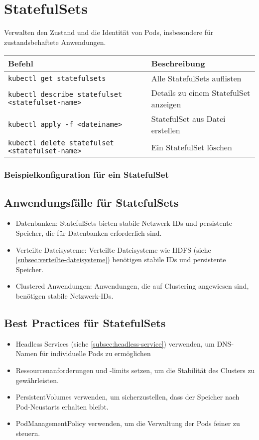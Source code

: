 \newpage
\section{StatefulSets}
\label{sec:statefulsets}

Verwalten den Zustand und die Identität von Pods, insbesondere für zustandsbehaftete Anwendungen. \\

\noindent
\begin{tabular}{
|l|l|}
\hline
\textbf{Befehl} & \textbf{Beschreibung} \\
\hline
\texttt{kubectl get statefulsets} & Alle StatefulSets auflisten \\
\texttt{kubectl describe statefulset <statefulset-name>} & Details zu einem StatefulSet anzeigen \\
\texttt{kubectl apply -f <dateiname>} & StatefulSet aus Datei erstellen\\
\texttt{kubectl delete statefulset <statefulset-name>} & Ein StatefulSet löschen \\
\hline
\end{tabular}

\subsubsection{Beispielkonfiguration für ein StatefulSet}


\newpage
\subsection{Anwendungsfälle für StatefulSets}
\begin{itemize}
    \item Datenbanken: StatefulSets bieten stabile Netzwerk-IDs und persistente Speicher, die für Datenbanken erforderlich sind.
    \item Verteilte Dateisysteme: Verteilte Dateisysteme wie HDFS (siehe \ref{subsec:verteilte-dateisysteme}) benötigen stabile IDs und persistente Speicher.
    \item Clustered Anwendungen: Anwendungen, die auf Clustering angewiesen sind, benötigen stabile Netzwerk-IDs.
\end{itemize}
\subsection{Best Practices für StatefulSets}
\begin{itemize}
    \item Headless Services (siehe \ref{subsec:headless-service}) verwenden, um DNS-Namen für individuelle Pods zu ermöglichen
    \item Ressourcenanforderungen und -limits setzen, um die Stabilität des Clusters zu gewährleisten.
    \item PersistentVolumes verwenden, um sicherzustellen, dass der Speicher nach Pod-Neustarts erhalten bleibt.
    \item PodManagementPolicy verwenden, um die Verwaltung der Pods feiner zu steuern.
\end{itemize}

